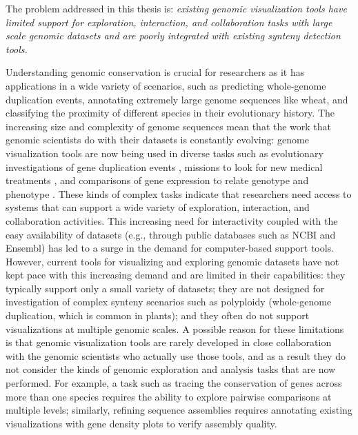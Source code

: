The problem addressed in this thesis is: \textit{existing genomic visualization tools have limited support for exploration, interaction, and collaboration tasks with large scale genomic datasets and are poorly integrated with existing synteny detection tools.}

Understanding genomic conservation is crucial for researchers as it has applications in a wide variety of scenarios, such as predicting whole-genome duplication events, annotating extremely large genome sequences like wheat, and classifying the proximity of different species in their evolutionary history. The increasing size and complexity of genome sequences mean that the work that genomic scientists do with their datasets is constantly evolving: genome visualization tools are now being used in diverse tasks such as evolutionary investigations of gene duplication events \cite{rubin2000comparative}, missions to look for new medical treatments \cite{collins2003vision}, and comparisons of gene expression to relate genotype and phenotype \cite{hanada2008importance}. These kinds of complex tasks indicate that researchers need access to systems that can support a wide variety of exploration, interaction, and collaboration activities. This increasing need for interactivity coupled with the easy availability of datasets (e.g., through public databases such as NCBI and Ensembl) has led to a surge in the demand for computer-based support tools. However, current tools for visualizing and exploring genomic datasets have not kept pace with this increasing demand and are limited in their capabilities: they typically support only a small variety of datasets; they are not designed for investigation of complex synteny scenarios such as polyploidy (whole-genome duplication, which is common in plants); and they often do not support visualizations at multiple genomic scales. A possible reason for these limitations is that genomic visualization tools are rarely developed in close collaboration with the genomic scientists who actually use those tools, and as a result they do not consider the kinds of genomic exploration and analysis tasks that are now performed. For example, a task such as tracing the conservation of genes across more than one species requires the ability to explore pairwise comparisons at multiple levels; similarly, refining sequence assemblies requires annotating existing visualizations with gene density plots to verify assembly quality. 




